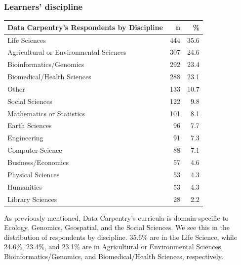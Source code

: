 \documentclass[]{article}
\begin{document}
\subsubsection{Learners' discipline}\label{learners-discipline}

\begin{longtable}[]{@{}lrr@{}}
\toprule
Data Carpentry's Respondents by Discipline & n & \%\tabularnewline
\midrule
\endhead
Life Sciences & 444 & 35.6\tabularnewline
Agricultural or Environmental Sciences & 307 & 24.6\tabularnewline
Bioinformatics/Genomics & 292 & 23.4\tabularnewline
Biomedical/Health Sciences & 288 & 23.1\tabularnewline
Other & 133 & 10.7\tabularnewline
Social Sciences & 122 & 9.8\tabularnewline
Mathematics or Statistics & 101 & 8.1\tabularnewline
Earth Sciences & 96 & 7.7\tabularnewline
Engineering & 91 & 7.3\tabularnewline
Computer Science & 88 & 7.1\tabularnewline
Business/Economics & 57 & 4.6\tabularnewline
Physical Sciences & 53 & 4.3\tabularnewline
Humanities & 53 & 4.3\tabularnewline
Library Sciences & 28 & 2.2\tabularnewline
\bottomrule
\end{longtable}

As previously mentioned, Data Carpentry's curricula is domain-specific
to Ecology, Genomics, Geospatial, and the Social Sciences. We see this
in the distribution of respondents by discipline. 35.6\% are in the Life
Science, while 24.6\%, 23.4\%, and 23.1\% are in Agricultural or
Environmental Sciences, Bioinformatics/Genomics, and Biomedical/Health
Sciences, respectively.
\end{document}
